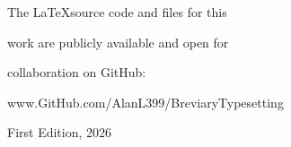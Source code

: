 \documentclass[openany]{book}
\renewcommand{\\}{\par\hspace*{.25em}} %
\newcommand{\ubchapter}[1]{%
	\chapter*{}%
	\addcontentsline{toc}{chapter}{#1}%
	\renewcommand{\leftmark}{#1}%
	\phantomsection%
	\hypertarget{#1}{}%
	\vspace{+\baselineskip}%
}
\newcommand{\ubsection}[2]{%
	\renewcommand{\rightmark}{#1}%
	\phantomsection%
	\addcontentsline{toc}{section}{#1}%
	\hypertarget{#2}{}%
}
\renewcommand{\newline}{\par}
\begin{document}
\begin{center}

\newline The \LaTeX source code and files for this
\newline work are publicly available and open for
\newline collaboration on GitHub:
\newline www.GitHub.com/AlanL399/BreviaryTypesetting
\end{center}
\begin{center}

First Edition, 2026
\end{center}









\frontmatter


% 

% 

\mainmatter

% 



% 

% 




\end{document}
